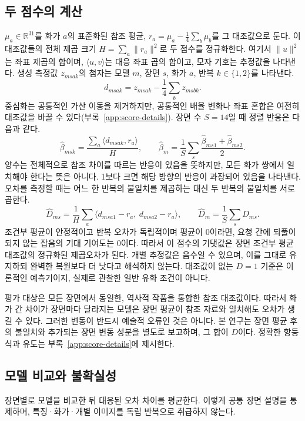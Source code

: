 \documentclass[11pt,a4paper]{article}
\newcommand{\R}{\mathbb R}
\begin{document}
\subsection{두 점수의 계산}
$\mu_a\in\R^{31}$를 화가 $a$의 표준화된 참조 평균, $r_a=\mu_a-\frac14\sum_b\mu_b$를 그 대조값으로 둔다. 이 대조값들의 전체 제곱 크기 $H=\sum_a\|r_a\|^2$로 두 점수를 정규화한다. 여기서 $\|u\|^2$는 좌표 제곱의 합이며, $\langle u,v\rangle$는 대응 좌표 곱의 합이고, 모자 기호는 추정값을 나타낸다. 생성 측정값 $z_{msak}$의 첨자는 모델 $m$, 장면 $s$, 화가 $a$, 반복 $k\in\{1,2\}$를 나타낸다.
\begin{equation}
 d_{msak}=z_{msak}-\frac14\sum_b z_{msbk}.
 \label{eq:center}
\end{equation}
중심화는 공통적인 가산 이동을 제거하지만, 공통적인 배율 변화나 좌표 혼합은 여전히 대조값을 바꿀 수 있다(부록~\ref{app:score-details}). 장면 수 $S=14$일 때 정렬 반응은 다음과 같다.
\begin{equation}
 \widehat\beta_{msk}=\frac{\sum_a\langle d_{msak},r_a\rangle}{H},\qquad
 \widehat\beta_m=\frac1S\sum_s\frac{\widehat\beta_{ms1}+\widehat\beta_{ms2}}2.
 \label{eq:beta}
\end{equation}
양수는 전체적으로 참조 차이를 따르는 반응이 있음을 뜻하지만, 모든 화가 쌍에서 일치해야 한다는 뜻은 아니다. 1보다 크면 해당 방향의 반응이 과장되어 있음을 나타낸다. 오차를 측정할 때는 어느 한 반복의 불일치를 제곱하는 대신 두 반복의 불일치를 서로 곱한다.
\begin{equation}
 \widehat D_{ms}=\frac1H\sum_a
 \langle d_{msa1}-r_a,\ d_{msa2}-r_a\rangle,\qquad
 \widehat D_m=\frac1S\sum_s\widehat D_{ms}.
 \label{eq:distortion}
\end{equation}
조건부 평균이 안정적이고 반복 오차가 독립적이며 평균이 0이라면, 요청 간에 되풀이되지 않는 잡음의 기대 기여도는 0이다. 따라서 이 점수의 기댓값은 장면 조건부 평균 대조값의 정규화된 제곱오차가 된다. 개별 추정값은 음수일 수 있으며, 이를 그대로 유지하되 완벽한 복원보다 더 낫다고 해석하지 않는다. 대조값이 없는 $D=1$ 기준은 이론적인 예측기이지, 실제로 관찰한 일반 유화 조건이 아니다.

평가 대상은 모든 장면에서 동일한, 역사적 작품을 통합한 참조 대조값이다. 따라서 화가 간 차이가 장면마다 달라지는 모델은 장면 평균이 참조 자료와 일치해도 오차가 생길 수 있다. 그러한 변동이 반드시 예술적 오류인 것은 아니다. 본 연구는 장면 평균 후의 불일치와 추가되는 장면 변동 성분을 별도로 보고하며, 그 합이 $D$이다. 정확한 항등식과 유도는 부록~\ref{app:score-details}에 제시한다.

\subsection{모델 비교와 불확실성}
장면별로 모델을 비교한 뒤 대응된 오차 차이를 평균한다. 이렇게 공통 장면 설명을 통제하며, 특징·화가·개별 이미지를 독립 반복으로 취급하지 않는다.
\end{document}
